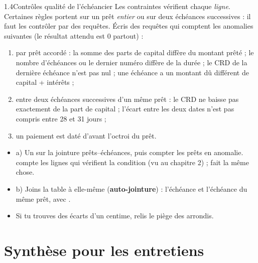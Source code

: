 \begin{exercice}{1.4}{Contrôles qualité de l'échéancier}
Les contraintes vérifient chaque \emph{ligne}. Certaines règles portent sur un prêt \emph{entier} ou sur
deux échéances successives : il faut les contrôler par des requêtes. Écris des requêtes qui comptent les
anomalies suivantes (le résultat attendu est 0 partout) :
\begin{enumerate}[label=\alph*)]
\item par prêt accordé : la somme des parts de capital diffère du montant prêté ; le nombre
d'échéances ou le dernier numéro diffère de la durée ; le CRD de la dernière échéance n'est pas nul ;
une échéance a un montant dû différent de capital + intérêts ;
\item entre deux échéances successives d'un même prêt : le CRD ne baisse pas exactement de la part
de capital ; l'écart entre les deux dates n'est pas compris entre 28 et 31 jours ;
\item un paiement est daté d'avant l'octroi du prêt.
\end{enumerate}
\end{exercice}

\begin{indice}
\begin{itemize}
\item a) Un  sur la jointure prêts--échéances, puis compter les prêts en
anomalie.  compte les lignes qui vérifient la condition (vu au
chapitre 2) ;  fait la même chose.
\item b) Joins la table à elle-même (\textbf{auto-jointure}) : l'échéance  et l'échéance
 du même prêt, avec .
\item Si tu trouves des écarts d'un centime, relis le piège des arrondis.
\end{itemize}
\end{indice}

\section{Synthèse pour les entretiens}

